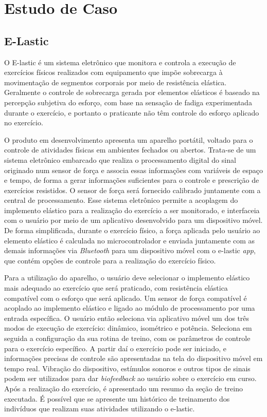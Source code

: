 \chapter{Estudo de Caso}
\label{cap:elastic}

\section{E-Lastic}
O E-lastic é um sistema eletrônico que monitora e controla a execução de exercícios físicos realizados com equipamento que impõe sobrecarga à movimentação de segmentos corporais por meio de resistência elástica. Geralmente o controle de sobrecarga gerada por elementos elásticos é baseado na percepção subjetiva do esforço, com base na sensação de fadiga experimentada durante o exercício, e portanto o praticante não têm controle do esforço aplicado no exercício.

O produto em desenvolvimento apresenta um aparelho portátil, voltado para o controle de atividades físicas em ambientes fechados ou abertos. Trata-se de um sistema eletrônico embarcado que realiza o processamento digital do sinal originado num sensor de força e associa essas informações com variáveis de espaço e tempo, de forma a gerar informações suficientes para o controle e prescrição de exercícios resistidos. O sensor de força será fornecido calibrado juntamente com a central de processamento. Esse sistema eletrônico permite a acoplagem do implemento elástico para a realização do exercício a ser monitorado, e interfaceia com o usuário por meio de um aplicativo desenvolvido para um dispositivo móvel. De forma simplificada, durante o exercício físico, a força aplicada pelo usuário ao elemento elástico é calculada no microcontrolador e enviada juntamente com as demais informações via \textit{Bluetooth} para um dispositivo móvel com o e-lastic \textit{app}, que contém opções de controle para a realização do exercício físico.

Para a utilização do aparelho, o usuário deve selecionar o implemento elástico mais adequado ao exercício que será praticado, com resistência elástica compatível com o esforço que será aplicado. Um sensor de força compatível é acoplado ao implemento elástico e ligado ao módulo de processamento por uma entrada específica. O usuário então seleciona via aplicativo móvel um dos três modos de execução de exercício: dinâmico, isométrico e potência. Seleciona em seguida a configuração da sua rotina de treino, com os parâmetros de controle para o exercício específico. A partir daí o exercício pode ser iniciado, e informações precisas de controle são apresentadas na tela do dispositivo móvel em tempo real. Vibração do dispositivo, estímulos sonoros e outros tipos de sinais podem ser utilizados para dar \textit{biofeedback} ao usuário sobre o exercício em curso. Após a realização do exercício, é apresentado um resumo da seção de treino executada. É possível que se apresente um histórico de treinamento dos indivíduos que realizam suas atividades utilizando o e-lastic.

